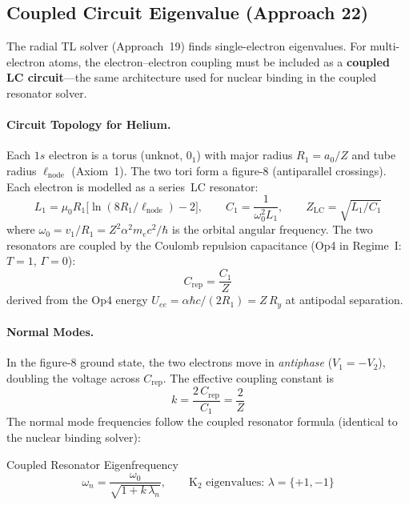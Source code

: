 \subsection{Coupled Circuit Eigenvalue (Approach 22)}
\label{sec:coupled_circuit}

The radial TL solver (Approach~19) finds single-electron eigenvalues.
For multi-electron atoms, the electron--electron coupling must be included
as a \textbf{coupled LC circuit}---the same architecture used for
nuclear binding in the coupled resonator solver.

\paragraph{Circuit Topology for Helium.}
Each $1s$ electron is a torus (unknot, $0_1$) with major radius
$R_1 = a_0/Z$ and tube radius $\ell_{\text{node}}$ (Axiom~1).
The two tori form a figure-8 (antiparallel crossings).
Each electron is modelled as a series~LC resonator:
\begin{equation}
    L_1 = \mu_0 R_1\bigl[\ln(8R_1/\ell_{\text{node}}) - 2\bigr], \qquad
    C_1 = \frac{1}{\omega_0^2 L_1}, \qquad
    Z_{\text{LC}} = \sqrt{L_1/C_1}
\end{equation}
where $\omega_0 = v_1/R_1 = Z^2\alpha^2 m_e c^2/\hbar$ is the orbital
angular frequency.  The two resonators are coupled by the Coulomb
repulsion capacitance (Op4 in Regime~I: $T=1$, $\Gamma=0$):
\begin{equation}
    C_{\text{rep}} = \frac{C_1}{Z}
    \label{eq:crep}
\end{equation}
derived from the Op4 energy $U_{ee} = \alpha\hbar c/(2R_1) = Z\,R_y$
at antipodal separation.

\paragraph{Normal Modes.}
In the figure-8 ground state, the two electrons move in \emph{antiphase}
($V_1 = -V_2$), doubling the voltage across $C_{\text{rep}}$.
The effective coupling constant is
\begin{equation}
    k = \frac{2\,C_{\text{rep}}}{C_1} = \frac{2}{Z}
    \label{eq:coupling_k}
\end{equation}
The normal mode frequencies follow the coupled resonator formula
(identical to the nuclear binding solver):
\begin{resultbox}{Coupled Resonator Eigenfrequency}
\begin{equation}
    \omega_n = \frac{\omega_0}{\sqrt{1 + k\,\lambda_n}}, \qquad
    \text{K}_2 \text{ eigenvalues: } \lambda = \{+1, -1\}
    \label{eq:coupled_eigenfreq}
\end{equation}
\end{resultbox}

